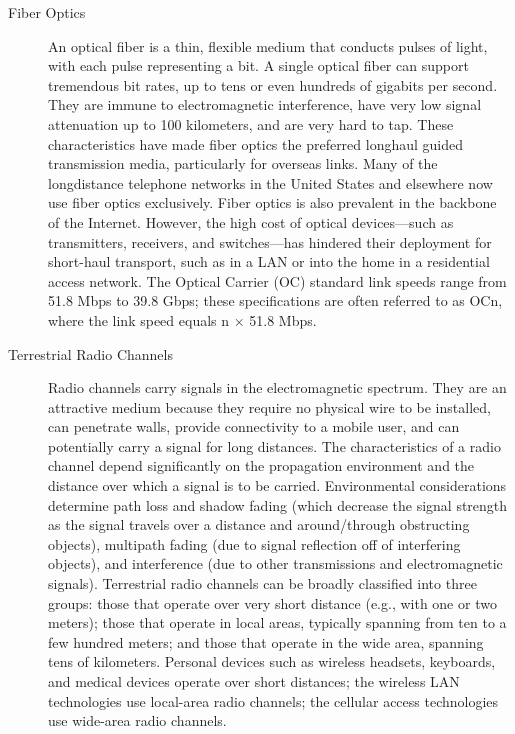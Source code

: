 \documentclass{article}
\begin{document}
\begin{description}
    \item[Fiber Optics] An optical fiber is a thin, flexible medium that conducts pulses of light, with each
    pulse representing a bit. A single optical fiber can support tremendous bit rates, up
    to tens or even hundreds of gigabits per second. They are immune to electromagnetic
    interference, have very low signal attenuation up to 100 kilometers, and are
    very hard to tap. These characteristics have made fiber optics the preferred longhaul
    guided transmission media, particularly for overseas links. Many of the longdistance
    telephone networks in the United States and elsewhere now use fiber optics
    exclusively. Fiber optics is also prevalent in the backbone of the Internet. However,
    the high cost of optical devices—such as transmitters, receivers, and switches—has
    hindered their deployment for short-haul transport, such as in a LAN or into the
    home in a residential access network. The Optical Carrier (OC) standard link speeds
    range from 51.8 Mbps to 39.8 Gbps; these specifications are often referred to as OCn,
    where the link speed equals n × 51.8 Mbps.

    \item[Terrestrial Radio Channels] Radio channels carry signals in the electromagnetic spectrum. They are an attractive
    medium because they require no physical wire to be installed, can penetrate walls,
    provide connectivity to a mobile user, and can potentially carry a signal for long distances.
    The characteristics of a radio channel depend significantly on the propagation
    environment and the distance over which a signal is to be carried. Environmental considerations
    determine path loss and shadow fading (which decrease the signal strength
    as the signal travels over a distance and around/through obstructing objects), multipath
    fading (due to signal reflection off of interfering objects), and interference (due
    to other transmissions and electromagnetic signals).
    Terrestrial radio channels can be broadly classified into three groups: those that
    operate over very short distance (e.g., with one or two meters); those that operate in
    local areas, typically spanning from ten to a few hundred meters; and those that
    operate in the wide area, spanning tens of kilometers. Personal devices such as wireless
    headsets, keyboards, and medical devices operate over short distances; the
    wireless LAN technologies use local-area radio channels;
    the cellular access technologies use wide-area radio channels.


\end{description}
\end{document}
